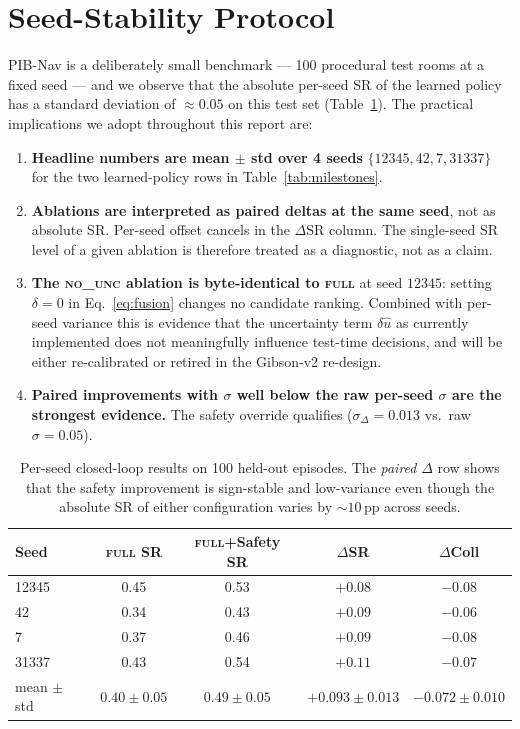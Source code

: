 \documentclass[11pt,a4paper]{article}
\begin{document}
\section{Seed-Stability Protocol}\label{sec:seedstab}

PIB-Nav is a deliberately small benchmark --- 100 procedural test
rooms at a fixed seed --- and we observe that the absolute per-seed SR
of the learned policy has a standard deviation of $\approx 0.05$ on
this test set (Table~\ref{tab:seedstab}). The practical implications
we adopt throughout this report are:

\begin{enumerate}
\item \textbf{Headline numbers are mean $\pm$ std over 4 seeds}
      $\{12345,42,7,31337\}$ for the two learned-policy rows in
      Table~\ref{tab:milestones}.
\item \textbf{Ablations are interpreted as paired deltas at the same
      seed}, not as absolute SR. Per-seed offset cancels in the
      $\Delta$SR column. The single-seed SR level of a given
      ablation is therefore treated as a diagnostic, not as a claim.
\item \textbf{The \textsc{no\_unc} ablation is byte-identical to
      \textsc{full}} at seed $12345$: setting $\delta=0$ in
      Eq.~\ref{eq:fusion} changes no candidate ranking. Combined with
      per-seed variance this is evidence that the uncertainty term
      $\delta\hat{u}$ as currently implemented does not meaningfully
      influence test-time decisions, and will be either re-calibrated
      or retired in the Gibson-v2 re-design.
\item \textbf{Paired improvements with $\sigma$ well below the raw
      per-seed $\sigma$ are the strongest evidence.} The safety
      override qualifies ($\sigma_\Delta=0.013$ vs.\ raw
      $\sigma=0.05$).
\end{enumerate}

\begin{table}[t]
\centering
\small
\caption{Per-seed closed-loop results on 100 held-out episodes. The
         \emph{paired} $\Delta$ row shows that the safety improvement
         is sign-stable and low-variance even though the absolute SR
         of either configuration varies by $\sim 10$\,pp across
         seeds.}
\label{tab:seedstab}
\begin{tabular}{lcccc}
\toprule
Seed & \textsc{full} SR & \textsc{full}+Safety SR & $\Delta$SR & $\Delta$Coll \\
\midrule
12345 & 0.45 & 0.53 & $+0.08$ & $-0.08$ \\
42    & 0.34 & 0.43 & $+0.09$ & $-0.06$ \\
7     & 0.37 & 0.46 & $+0.09$ & $-0.08$ \\
31337 & 0.43 & 0.54 & $+0.11$ & $-0.07$ \\
\midrule
mean $\pm$ std & $0.40\pm 0.05$ & $0.49\pm 0.05$ & $+0.093\pm 0.013$ & $-0.072\pm 0.010$ \\
\bottomrule
\end{tabular}
\end{table}
\end{document}
